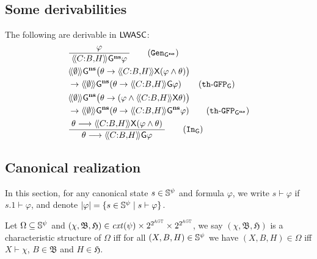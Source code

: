 \subsection{Some derivabilities}\label{section: some derivabilities}
\begin{theorem}
  The following are derivable in $\mathsf{LWASC}$:
  \begin{align*}  
    & \dfrac{\; \phi \;}{\; \atlbh{\Coalition}{B}{H}\G^\ns \phi \;} 
  \tag{$\mathtt{Gen}_{\G^\ns}$} \label{ir:Gen_Gw}
  \\
    & 
     \atlop{\emptyset}\G^\ns\big (\theta \rightarrow \atlbh{\Coalition}{B}{H}\X(\phi \wedge \theta)\big ) \\
     &
     \rightarrow \atlop{\emptyset }\G^\ns (\theta \rightarrow \atlbh{\Coalition}{B}{H}\G \phi)  \tag{$\mathtt{th}\text{-}\mathtt{GFP}_\G$} \label{th:GFP_G}
     \\
    & 
     \atlop{\emptyset}\G^\ns\big (\theta \rightarrow (\phi \wedge \atlbh{\Coalition}{B}{H}\X\theta)\big ) \\
     &
     \rightarrow \atlop{\emptyset }\G^\ns (\theta \rightarrow \atlbh{\Coalition}{B}{H}\G^\ns \phi)  \tag{$\mathtt{th}\text{-}\mathtt{GFP}_{\G^\ns}$} \label{th:GFP_Gw}
     \\
    & 
     \dfrac{\; \theta \to \atlbh{\Coalition}{B}{H}\X(\phi \wedge \theta) \;}{\; \theta \to \atlbh{\Coalition}{B}{H}\G \phi\;}  \tag{$\mathtt{In}_\G$} \label{ir:In_G}
  \end{align*}
  \end{theorem}  


\subsection{Canonical realization}\label{sec: canonical realization}
In this section, for any canonical state $s\in \mathbb{S}^\psi$ and formula $\varphi$, we write $s\vdash \varphi $ if $s.1\vdash \varphi $, and denote $| \varphi | = \{s\in \mathbb{S}^\psi \mid s\vdash \varphi \}$.

\begin{definition}\label{def: Characteristic
structure}
  Let $\Omega \subseteq \mathbb{S}^\psi$ and $(\chi ,\mathfrak{B},\mathfrak{H}) \in \mathit{cxt}(\psi)\times 2^{2^{\mathbb{AGT}}}\times 2^{2^{\mathbb{AGT}}}$, we say $(\chi ,\mathfrak{B},\mathfrak{H})$ is a characteristic structure of $\Omega$ iff for all $(X ,B,H)\in \mathbb{S}^\psi$ we have $(X ,B,H)\in \Omega$ iff $X\vdash \chi $, $B \in \mathfrak{B}$ and $H \in \mathfrak{H}$.
\end{definition}

